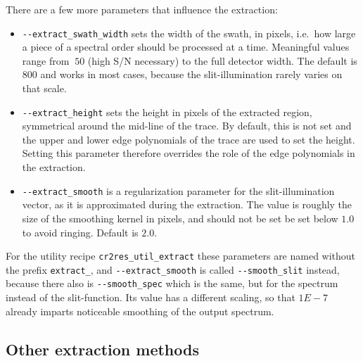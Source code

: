 
There are a few more parameters that influence the extraction:
\begin{itemize}
    \item \verb!--extract_swath_width! sets the width of the swath, in pixels,
    i.e.~how large a piece of a spectral order should be processed at a time.
    Meaningful values range from $~50$ (high S/N necessary) to the full detector
    width. The default is $800$ and works in most cases, because the
    slit-illumination rarely varies on that scale.
    \item \verb!--extract_height! sets the height in pixels of the extracted
    region, symmetrical around the mid-line of the trace. By default, this is
    not set and the upper and lower edge polynomials of the trace are used to
    set the height. Setting this parameter therefore overrides the role of the
    edge polynomials in the extraction.
    \item \verb!--extract_smooth! is a regularization parameter for the
    slit-illumination vector, as it is approximated during the extraction. The
    value is roughly the size of the smoothing kernel in pixels, and should not
    be set be set below $1.0$ to avoid ringing. Default is $2.0$.
\end{itemize}

For the utility recipe \verb!cr2res_util_extract! these parameters are named
without the prefix \verb!extract_!, and \verb!--extract_smooth! is called
\verb!--smooth_slit! instead, because there also is \verb!--smooth_spec! which
is the same, but for the spectrum instead of the slit-function. Its value has a
different scaling, so that $1E-7$ already imparts noticeable smoothing of the
output spectrum.

\subsection{Other extraction methods}
\label{sec:otherextr}

